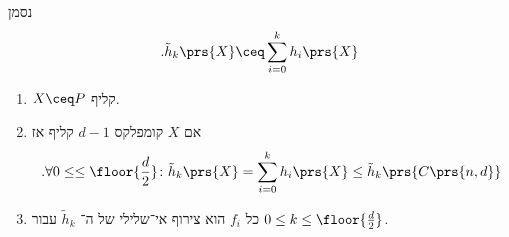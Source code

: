 \documentclass[a4paper,10pt,twoside,openany]{book}
\begin{document}

\begin{notation}
נסמן
\[\text{.} \tilde{h}_k \prs{X} \ceq \sum_{i=0}^k h_i\prs{X}\]
\end{notation}

\begin{theorem}
\begin{enumerate}
\item $X \ceq P$
קליף.
\item אם
$X$
קומפלקס
$d-1$
קליף אז
\[\text{.} \forall 0 \leq  \leq \floor{\frac{d}{2}} \colon \tilde{h}_k\prs{X} = \sum_{i=0}^k h_i\prs{X} \leq \tilde{h}_k\prs{C\prs{n,d}}\]
\item כל
$f_i$
הוא צירוף אי־שלילי של ה־%
$\tilde{h}_k$
עבור
$0 \leq k \leq \floor{\frac{d}{2}}$.
\end{enumerate}
\end{theorem}


\backmatter
\end{document}
